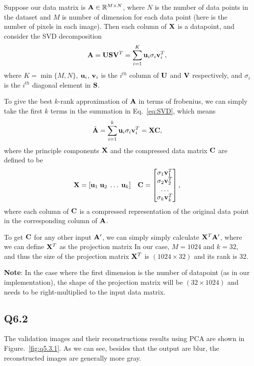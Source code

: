 \documentclass[11pt]{article}
\begin{document}
Suppose our data matrix is $\mathbf{A} \in \mathbb{R}^{M\times N}$, where $N$ is the number of data points in the dataset and $M$ is number of dimension for each data point (here is the number of pixels in each image). Then each column of $\mathbf{X}$ is a datapoint, and consider the SVD decomposition
\begin{align} \label{eq:SVD}
  \mathbf{A} = \mathbf{U}\mathbf{S}\mathbf{V}^T  = \sum_{i=1}^K \mathbf{u}_i \sigma_i \mathbf{v}_i^T,
\end{align}
where $K=\min\{M, N\}$, $\mathbf{u}_i$, $\mathbf{v}_i$ is the $i^{th}$ column of $\mathbf{U}$ and $\mathbf{V}$ respectively,
and $\sigma_i$ is the $i^{th}$ diagonal element in $\mathbf{S}$.

To give the best $k$-rank approximation of $\mathbf{A}$ in terms of frobenius, we can simply take the first $k$ terms in the summation in Eq.~\ref{eq:SVD}, which means
\begin{align}
  \hat{\mathbf{A}} = \sum_{i=1}^k \mathbf{u}_i \sigma_i \mathbf{v}_i^T = \mathbf{X} \mathbf{C},
\end{align}
where the principle components $\mathbf{X}$ and the compressed data matrix $\mathbf{C}$ are defined to be
\begin{align}
  \mathbf{X} = [ \mathbf{u}_1\;\mathbf{u}_2\;\dots\;\mathbf{u}_k ] \quad
  \mathbf{C} =
  \begin{bmatrix}
    \sigma_1\mathbf{v}_1^T \\ \sigma_2\mathbf{v}_2^T \\ \dots \\ \sigma_k\mathbf{v}_k^T
  \end{bmatrix},
\end{align}
where each column of $\mathbf{C}$ is a compressed representation of the original data point in the corresponding column of $\mathbf{A}$.

To get $\mathbf{C}$ for any other input $\mathbf{A}'$, we can simply simply calculate $\mathbf{X}^T\mathbf{A}'$, where we can define $\mathbf{X}^T$ as the projection matrix
In our case, $M=1024$ and $k=32$, and thus the size of the projection matrix $\mathbf{X}^T$ is $(1024 \times 32)$ and its rank is 32.

\textbf{Note}: In the case where the first dimension is the number of datapoint (as in our implementation), the shape of the projection matrix will be $(32 \times 1024)$ and needs to be right-multiplied to the input data matrix.

\newpage

\subsection*{Q6.2}

The validation images and their reconstructions results using PCA are shown in Figure.~\ref{fig:q5.3.1}. As we can see, besides that the output are blur, the reconstructed images are generally more gray.
\end{document}
